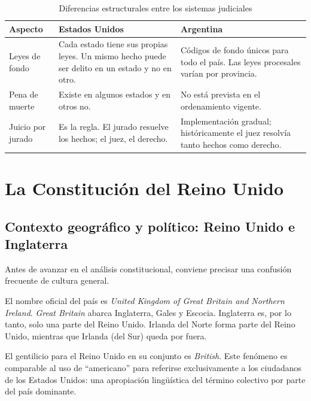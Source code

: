 \documentclass[12pt,oneside]{book}
\begin{document}
\begin{table}[H]
\centering
\caption{Diferencias estructurales entre los sistemas judiciales}
\begin{tabularx}{\textwidth}{>{\raggedright\arraybackslash}p{} >{\raggedright\arraybackslash}X >{\raggedright\arraybackslash}X}
\toprule
\textbf{Aspecto} & \textbf{Estados Unidos} & \textbf{Argentina} \\
\midrule
Leyes de fondo & Cada estado tiene sus propias leyes. Un mismo hecho puede ser delito en un estado y no en otro. & Códigos de fondo únicos para todo el país. Las leyes procesales varían por provincia. \\
Pena de muerte & Existe en algunos estados y en otros no. & No está prevista en el ordenamiento vigente. \\
Juicio por jurado & Es la regla. El jurado resuelve los hechos; el juez, el derecho. & Implementación gradual; históricamente el juez resolvía tanto hechos como derecho. \\
\bottomrule
\end{tabularx}
\end{table}

\chapter{La Constitución del Reino Unido}
\label{cap:reino-unido}

\section{Contexto geográfico y político: Reino Unido e Inglaterra}

Antes de avanzar en el análisis constitucional, conviene precisar una confusión frecuente de cultura general.

\begin{important}
El nombre oficial del país es \textit{United Kingdom of Great Britain and Northern Ireland}. \textit{Great Britain} abarca Inglaterra, Gales y Escocia. Inglaterra es, por lo tanto, solo una parte del Reino Unido. Irlanda del Norte forma parte del Reino Unido, mientras que Irlanda (del Sur) queda por fuera.

El gentilicio para el Reino Unido en su conjunto es \textit{British}. Este fenómeno es comparable al uso de ``americano'' para referirse exclusivamente a los ciudadanos de los Estados Unidos: una apropiación lingüística del término colectivo por parte del país dominante.
\end{important}
\end{document}
